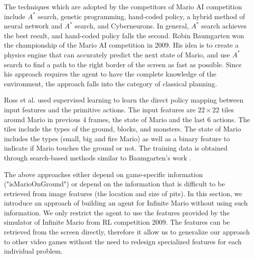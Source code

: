 
The techniques which are adopted by the competitors of Mario AI competition include
$A^*$ search, genetic programming, hand-coded policy, a hybrid method of neural network and $A^*$ search,
and Cyberneurons.
In general, $A^*$ search achieves the best result, and hand-coded policy falls the second.
Robin Baumgarten \cite{Robin09} won the championship of the Mario AI competition in 2009.
His idea is to create a physics engine that can accurately predict the next state of Mario, 
and use $A^*$ search to find a path to the right border of the screen as fast as possible.
Since his approach requires the agent to have the complete knowledge of the environment,
the approach falls into the category of classical planning.


Ross et al. \cite{Ross11} used supervised learning to learn the direct policy
mapping between input features and the primitive actions. The input features
are $22 \times 22$ tiles around Mario in previous 4 frames, the state of Mario
and the last 6 actions. The tiles include the types of the ground, blocks, and
monsters.  The state of Mario includes the types (small, big and fire Mario) as well as a
binary feature to indicate if Mario touches the ground or not.
The training data is obtained through search-based methods similar to Baumgarten's work \cite{Robin09}.


The above approaches either depend on game-specific information ("isMarioOnGround")
or depend on the information that is difficult to be retrieved from image features (the location and size of pits).
In this section, we introduce an approach 
of building an agent for Infinite Mario 
without using such information.
We only restrict the agent to use the features provided by the simulator of Infinite Mario from RL competition 2009.
The features can be retrieved from the screen directly, 
therefore it allow us to generalize our approach to other video games without
the need to redesign specialized features for each individual problem.

